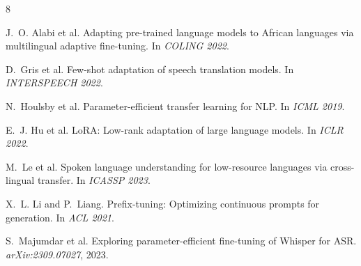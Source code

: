 \documentclass[11pt,a4paper]{article}
\begin{document}
\begin{thebibliography}{8}

J.~O. Alabi et al.
\newblock Adapting pre-trained language models to {A}frican languages via multilingual adaptive fine-tuning.
\newblock In \emph{COLING 2022}.

D.~Gris et al.
\newblock Few-shot adaptation of speech translation models.
\newblock In \emph{INTERSPEECH 2022}.

N.~Houlsby et al.
\newblock Parameter-efficient transfer learning for {NLP}.
\newblock In \emph{ICML 2019}.

E.~J. Hu et al.
\newblock Lo{RA}: Low-rank adaptation of large language models.
\newblock In \emph{ICLR 2022}.

M.~Le et al.
\newblock Spoken language understanding for low-resource languages via cross-lingual transfer.
\newblock In \emph{ICASSP 2023}.

X.~L. Li and P.~Liang.
\newblock Prefix-tuning: Optimizing continuous prompts for generation.
\newblock In \emph{ACL 2021}.

S.~Majumdar et al.
\newblock Exploring parameter-efficient fine-tuning of {Whisper} for {ASR}.
\newblock \emph{arXiv:2309.07027}, 2023.

\end{thebibliography}
\end{document}
